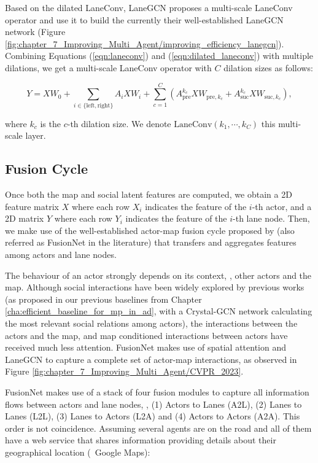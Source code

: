 Based on the dilated LaneConv, LaneGCN \cite{liang2020learning} proposes a multi-scale LaneConv operator and use it to build the currently their well-established LaneGCN network (Figure \ref{fig:chapter_7_Improving_Multi_Agent/improving_efficiency_lanegcn}). Combining Equations (\ref{eqn:laneconv}) and (\ref{eqn:dilated_laneconv}) with multiple dilations, we get a multi-scale LaneConv operator with $C$ dilation sizes as follows:

\begin{equation}\label{eqn:dilated_laneconv_final}
	Y = XW_0 + \sum_{i \in \{ \text{left}, \text{right} \}} {A_{i} X W_{i}}
	+ \sum_{c=1}^{C} {\left( A_{\text{pre}}^{k_{c}} X W_{\text{pre},k_{c}} + A_{\text{suc}}^{k_{c}} X W_{\text{suc},k_{c}} \right)},
\end{equation}

where $k_c$ is the $c$-th dilation size. We denote  $\text{LaneConv}(k_1, \cdots, k_C)$ this multi-scale layer. 

\subsection{Fusion Cycle}
\label{subsec:4_improving_efficiency_fusion_cycle}

Once both the map and social latent features are computed, we obtain a 2D feature matrix $X$ where each row $X_i$ indicates the feature of the $i$-th actor, and a 2D matrix $Y$ where each row $Y_i$ indicates the feature of the $i$-th lane node. Then, we make use of the well-established actor-map fusion cycle proposed by \cite{liang2020learning} (also referred as FusionNet in the literature) that transfers and aggregates features among actors and lane nodes. 

The behaviour of an actor strongly depends on its context, \ie, other actors and the map. Although social interactions have been widely explored by previous works (as proposed in our previous baselines from Chapter \ref{cha:efficient_baseline_for_mp_in_ad}, with a Crystal-\ac{GCN} network calculating the most relevant social relations among actors), the interactions between the actors and the map, and map conditioned interactions between actors have received much less attention. FusionNet makes use of spatial attention and LaneGCN to capture a complete set of actor-map interactions, as observed in Figure \ref{fig:chapter_7_Improving_Multi_Agent/CVPR_2023}.

FusionNet makes use of a stack of four fusion modules to capture all information flows between actors and lane nodes, \ie, (1) Actors to Lanes (A2L), (2) Lanes to Lanes (L2L), (3) Lanes to Actors (L2A) and (4) Actors to Actors (A2A). This order is not coincidence. Assuming several agents are on the road and all of them have a web service that shares information providing details about their geographical location (\eg \ Google Maps):

